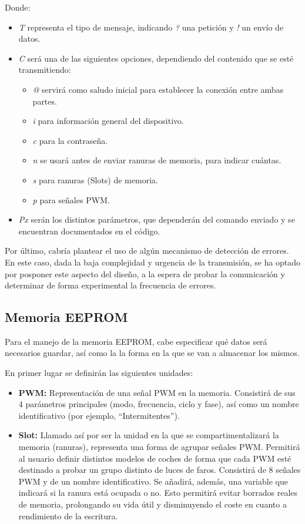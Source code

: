 Donde:

\begin{itemize}
    \item\textit{T} representa el tipo de mensaje, indicando \textit{?} una petición y \textit{!} un envío de datos.
    \item\textit{C} será una de las siguientes opciones, dependiendo del contenido que se esté transmitiendo:
        \begin{itemize}
            \item\textit{@} servirá como saludo inicial para establecer la conexión entre ambas partes.
            \item\textit{i} para información general del dispositivo.
            \item\textit{c} para la contraseña.
            \item\textit{n} se usará antes de enviar ranuras de memoria, para indicar cuántas.
            \item\textit{s} para ranuras (Slots) de memoria.
            \item\textit{p} para señales PWM.
        \end{itemize}
    \item\textit{Px} serán los distintos parámetros, que dependerán del comando enviado y se encuentran documentados en el código.
\end{itemize}

Por último, cabría plantear el uso de algún mecanismo de detección de errores. En este caso, dada la baja complejidad y urgencia de la transmisión, se ha optado por posponer este aspecto del diseño, a la espera de probar la comunicación y determinar de forma experimental la frecuencia de errores.

\subsection{Memoria EEPROM}

Para el manejo de la memoria EEPROM, cabe especificar qué datos será necesarios guardar, así como la la forma en la que se van a almacenar los mismos.

En primer lugar se definirán las siguientes unidades:

\begin{itemize}
    \item\textbf{PWM:} Representación de una señal PWM en la memoria. Consistirá de sus 4 parámetros principales (modo, frecuencia, ciclo y fase), así como un nombre identificativo (por ejemplo, ``Intermitentes'').
    \item\textbf{Slot:} Llamado así por ser la unidad en la que se compartimentalizará la memoria (ranuras), representa una forma de agrupar señales PWM. Permitirá al usuario definir distintos modelos de coches de forma que cada PWM esté destinado a probar un grupo distinto de luces de faros. Consistirá de 8 señales PWM y de un nombre identificativo. Se añadirá, además, una variable que indicará si la ranura está ocupada o no. Esto permitirá evitar borrados reales de memoria, prolongando su vida útil y disminuyendo el coste en cuanto a rendimiento de la escritura.
\end{itemize}

